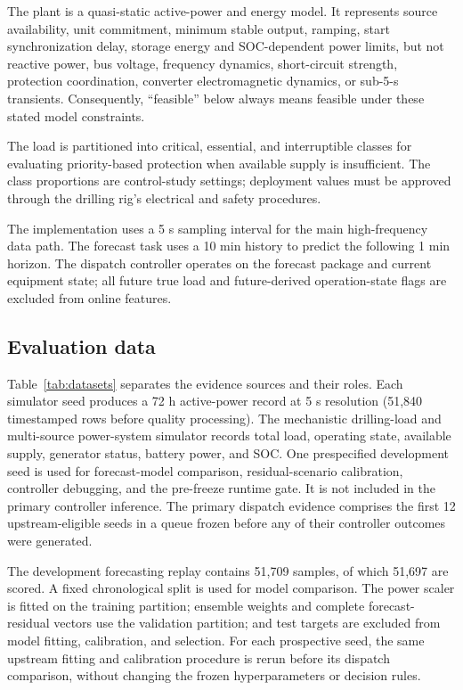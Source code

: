 The plant is a quasi-static active-power and energy model. It represents source
availability, unit commitment, minimum stable output, ramping, start
synchronization delay, storage energy and SOC-dependent power limits, but not
reactive power, bus voltage, frequency dynamics, short-circuit strength,
protection coordination, converter electromagnetic dynamics, or sub-5-s
transients. Consequently, ``feasible'' below always means feasible under these
stated model constraints.

The load is partitioned into critical, essential, and interruptible classes
for evaluating priority-based protection when available supply is
insufficient. The class proportions are control-study settings; deployment
values must be approved through the drilling rig's electrical and safety
procedures.

The implementation uses a 5 s sampling interval for the main
high-frequency data path. The forecast task uses a 10 min history to
predict the following 1 min horizon. The dispatch controller operates on
the forecast package and current equipment state; all future true load
and future-derived operation-state flags are excluded from online
features.

\subsection{Evaluation data}\label{evaluation-data}

Table~\ref{tab:datasets} separates the evidence sources and their roles. Each
simulator seed produces a 72 h active-power record at 5 s resolution (51,840
timestamped rows before quality processing). The mechanistic drilling-load and
multi-source power-system simulator records total load, operating state,
available supply, generator status, battery power, and SOC. One prespecified
development seed is used for forecast-model comparison, residual-scenario
calibration, controller debugging, and the pre-freeze runtime gate. It is not
included in the primary controller inference. The primary dispatch evidence
comprises the first 12 upstream-eligible seeds in a queue frozen before any of
their controller outcomes were generated.

The development forecasting replay contains 51,709 samples, of which 51,697
are scored. A fixed chronological split is used for model comparison. The power
scaler is fitted on the training partition; ensemble weights and complete
forecast-residual vectors use the validation partition; and test targets are
excluded from model fitting, calibration, and selection. For each prospective
seed, the same upstream fitting and calibration procedure is rerun before its
dispatch comparison, without changing the frozen hyperparameters or decision
rules.

